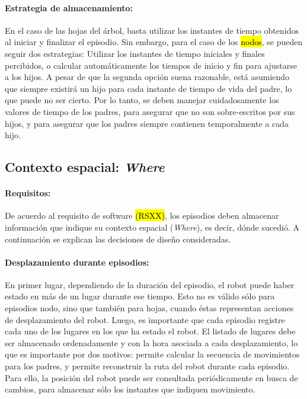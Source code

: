 \paragraph{Estrategia de almacenamiento:}
En el caso de las hojas del árbol, basta utilizar los instantes de tiempo obtenidos al iniciar y finalizar el episodio. Sin embargo, para el caso de los \hl{nodos}, se pueden seguir dos estrategias: Utilizar los instantes de tiempo iniciales y finales percibidos, o calcular automáticamente los tiempos de inicio y fin para ajustarse a los hijos. A pesar de que la segunda opción suena razonable, está asumiendo que siempre existirá un hijo para cada instante de tiempo de vida del padre, lo que puede no ser cierto. Por lo tanto, se deben manejar cuidadosamente los valores de tiempo de los padres, para asegurar que no son sobre-escritos por sus hijos, y para asegurar que los padres siempre contienen temporalmente a cada hijo.


 
\subsection{Contexto espacial: \textit{Where}}

\paragraph{Requisitos:}
De acuerdo al requisito de software \hl{(RSXX)}, los episodios deben almacenar información que indique su contexto espacial (\textit{Where}), es decir, dónde sucedió. A continuación se explican las decisiones de diseño consideradas.

\paragraph{Desplazamiento durante episodios:}
En primer lugar, dependiendo de la duración del episodio, el robot puede haber estado en más de un lugar durante ese tiempo. Esto no es válido sólo para episodios nodo, sino que también para hojas, cuando éstas representan acciones de desplazamiento del robot. Luego, es importante que cada episodio registre cada uno de los lugares en los que ha estado el robot. El listado de lugares debe ser almacenado ordenadamente y con la hora asociada a cada desplazamiento, lo que es importante por dos motivos: permite calcular la secuencia de movimientos para los padres, y permite reconstruir la ruta del robot durante cada episodio. Para ello, la posición del robot puede ser consultada periódicamente en busca de cambios, para almacenar sólo los instantes que indiquen movimiento.


